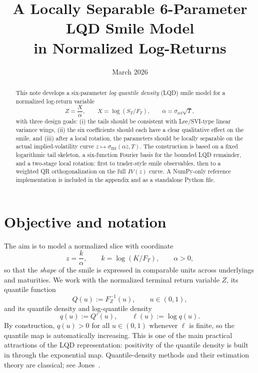 \documentclass[11pt]{article}
\title{A Locally Separable 6-Parameter LQD Smile Model \\ in Normalized Log-Returns}
\author{}
\date{March 2026}
\newcommand{\iv}{\sigma_{\mathrm{BS}}}
\begin{document}
\maketitle
\thispagestyle{fancy}

\begin{abstract}
This note develops a six-parameter \emph{log quantile density} (LQD) smile model for a normalized log-return variable
\[
Z = \frac{X}{\alpha}, \qquad X = \log(S_T/F_T), \qquad \alpha = \sigma_{\mathrm{ref}}\sqrt{T},
\]
with three design goals: (i) the tails should be consistent with Lee/SVI-type linear variance wings, (ii) the six coefficients should each have a clear qualitative effect on the smile, and (iii) after a local rotation, the parameters should be locally separable on the actual implied-volatility curve $z \mapsto \iv(\alpha z,T)$. The construction is based on a fixed logarithmic tail skeleton, a six-function Fourier basis for the bounded LQD remainder, and a two-stage local rotation: first to trader-style smile observables, then to a weighted QR orthogonalization on the full $IV(z)$ curve. A NumPy-only reference implementation is included in the appendix and as a standalone Python file.
\end{abstract}

\tableofcontents

\section{Objective and notation}
The aim is to model a normalized slice with coordinate
\[
z = \frac{k}{\alpha}, \qquad k = \log(K/F_T), \qquad \alpha > 0,
\]
so that the \emph{shape} of the smile is expressed in comparable units across underlyings and maturities. We work with the normalized terminal return variable $Z$, its quantile function
\[
Q(u) := F_Z^{-1}(u), \qquad u \in (0,1),
\]
and its quantile density and log-quantile density
\[
q(u) := Q'(u), \qquad \ell(u) := \log q(u).
\]
By construction, $q(u) > 0$ for all $u \in (0,1)$ whenever $\ell$ is finite, so the quantile map is automatically increasing. This is one of the main practical attractions of the LQD representation: positivity of the quantile density is built in through the exponential map. Quantile-density methods and their estimation theory are classical; see Jones~\cite{Jones1992}.
\end{document}
